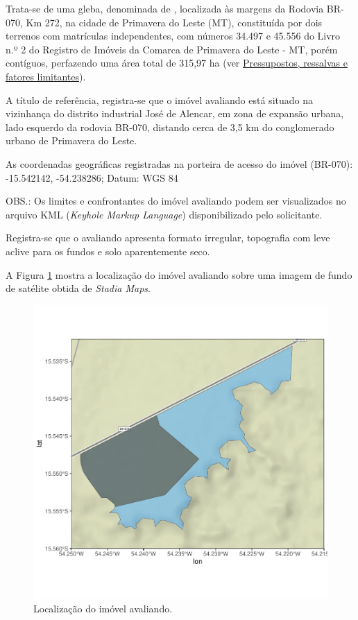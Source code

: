 \documentclass[
  10pt,
  a4paper]{article}
\begin{document}
Trata-se de uma gleba, denominada de ,
localizada às margens da Rodovia BR-070, Km 272, na cidade de Primavera
do Leste (MT), constituída por dois terrenos com matrículas
independentes, com números 34.497 e 45.556 do Livro n.º 2 do Registro de
Imóveis da Comarca de Primavera do Leste - MT, porém contíguos,
perfazendo uma área total de 315,97 ha (ver
\hyperref[pressupostos-ressalvas-e-fatores-limitantes]{Pressupostos,
ressalvas e fatores limitantes}).

A título de referência, registra-se que o imóvel avaliando está situado
na vizinhança do distrito industrial José de Alencar, em zona de
expansão urbana, lado esquerdo da rodovia BR-070, distando cerca de 3,5
km do conglomerado urbano de Primavera do Leste.

As coordenadas geográficas registradas na porteira de acesso do imóvel
(BR-070): -15.542142, -54.238286; Datum: WGS 84

OBS.: Os limites e confrontantes do imóvel avaliando podem ser
visualizados no arquivo KML (\emph{Keyhole Markup Language})
disponibilizado pelo solicitante.

Registra-se que o avaliando apresenta formato irregular, topografia com
leve aclive para os fundos e solo aparentemente seco.

A Figura \ref{fig:Perimetro} mostra a localização do imóvel avaliando
sobre uma imagem de fundo de satélite obtida de \emph{Stadia Maps}.

\begin{figure}[H]

{\centering \includegraphics[width=0.9\linewidth]{images/Perimetro-1} 

}

\caption{Localização do imóvel avaliando.}\label{fig:Perimetro}
\end{figure}
\end{document}
